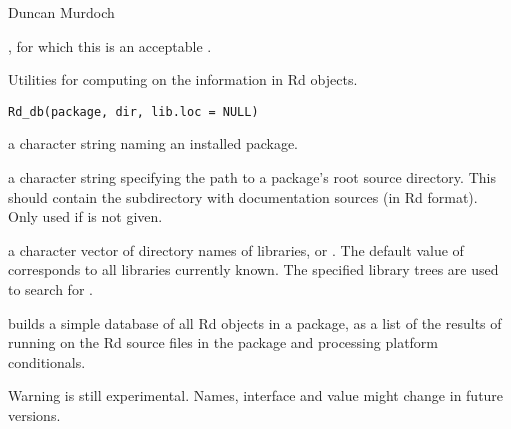 %
\begin{Author}\relax
Duncan Murdoch
\end{Author}
%
\begin{SeeAlso}\relax
{}, for which this is an acceptable .
\end{SeeAlso}
%
\begin{Description}\relax
Utilities for computing on the information in Rd objects.
\end{Description}
%
\begin{Usage}
\begin{verbatim}
Rd_db(package, dir, lib.loc = NULL)
\end{verbatim}
\end{Usage}
%
\begin{Arguments}
\begin{ldescription}
\item[\code{package}] a character string naming an installed package.
\item[\code{dir}] a character string specifying the path to a package's root
source directory.  This should contain the subdirectory 
with \R{} documentation sources (in Rd format).  Only used if
 is not given.
\item[\code{lib.loc}] a character vector of directory names of \R{} libraries,
or .  The default value of  corresponds to all
libraries currently known.  The specified library trees are used to
search for .
\end{ldescription}
\end{Arguments}
%
\begin{Details}\relax
{} builds a simple database of all Rd objects in a package,
as a list of the results of running  on the Rd
source files in the package and processing platform conditionals.
\end{Details}
%
\begin{Section}{Warning}
 is still experimental.  Names, interface and value might
change in future versions.
\end{Section}
%
\begin{SeeAlso}\relax
{}
\end{SeeAlso}
%
